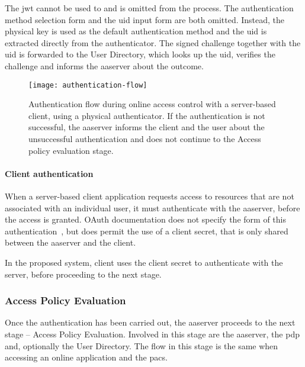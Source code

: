 The \acrshort{jwt} cannot be used to and is omitted from the process. The authentication method selection form and the \acrshort{uid} input form are both omitted. Instead, the physical key is used as the default authentication method and the \acrshort{uid} is extracted directly from the authenticator. The signed challenge together with the \acrshort{uid} is forwarded to the User Directory, which looks up the \acrshort{uid}, verifies the challenge and informs the \acrshort{aaserver} about the outcome.

\begin{sidewaysfigure}[p]
    \centering
    \texttt{[image: authentication-flow]}
    \caption{Authentication flow during online access control with a server-based client, using a physical authenticator. If the authentication is not successful, the \acrshort{aaserver} informs the client and the user about the unsuccessful authentication and does not continue to the Access policy evaluation stage.}
    \label{fig:authentication-flow}
\end{sidewaysfigure}
\restoregeometry

\paragraph{Client authentication}
When a server-based client application requests access to resources that are not associated with an individual user, it must authenticate with the \acrshort{aaserver}, before the access is granted. OAuth documentation does not specify the form of this authentication~\cite{Hardt2012TheFramework}, but does permit the use of a client secret, that is only shared between the \acrshort{aaserver} and the client.

In the proposed system, client uses the client secret to authenticate with the server, before proceeding to the next stage.

\subsubsection{Access Policy Evaluation}
Once the authentication has been carried out, the \acrshort{aaserver} proceeds to the next stage -- Access Policy Evaluation. Involved in this stage are the \acrshort{aaserver}, the \acrshort{pdp} and, optionally the User Directory. The flow in this stage is the same when accessing an online application and the \acrshort{pacs}.

